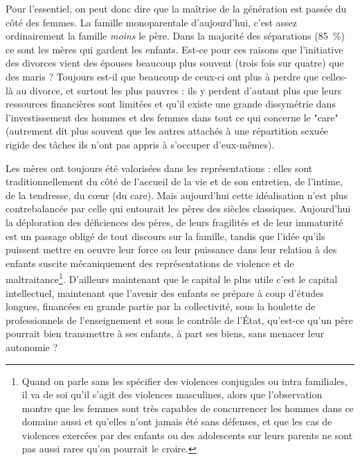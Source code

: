  Pour l'essentiel, on peut donc dire que la maîtrise de la génération est passée du côté des femmes. La famille monoparentale d'aujourd'hui, c'est assez ordinairement la famille \emph{moins} le père. Dans la majorité des séparations (85~\%) ce sont les mères qui gardent les enfants. Est-ce pour ces raisons que l'initiative des divorces vient des épouses beaucoup plus souvent (trois fois sur quatre) que des maris  ? Toujours est-il que beaucoup de ceux-ci ont plus à perdre que celles-là au divorce, et surtout les plus pauvres : ils y perdent d'autant plus que leurs ressources financières sont limitées et qu'il existe une grande dissymétrie dans l'investissement des hommes et des femmes dans tout ce qui concerne le "care" (autrement dit plus souvent que les autres attachés à une répartition sexuée rigide des tâches ils n'ont pas appris à s'occuper d'eux-mêmes). 

 Les mères ont toujours été valorisées dans les représentations : elles sont traditionnellement du côté de l'accueil de la vie et de son entretien, de l'intime, de la tendresse, du cœur (du care). Mais aujourd'hui cette idéalisation n'est plus contrebalancée par celle qui entourait les pères des siècles classiques. Aujourd'hui la déploration des déficiences des pères, de leurs fragilités et de leur immaturité est un passage obligé de tout discours sur la famille, tandis que l'idée qu'ils puissent mettre en oeuvre leur force ou leur puissance dans leur relation à des enfants suscite mécaniquement des représentations de violence et de maltraitance\footnote{Quand on parle sans les spécifier des violences conjugales ou intra familiales, il va de soi qu'il s'agit des violences masculines, alors que l'observation montre que les femmes sont très capables de concurrencer les hommes dans ce domaine aussi et qu'elles n'ont jamais été sans défenses, et que les cas de violences exercées par des enfants ou des adolescents sur leurs parents ne sont pas aussi rares qu'on pourrait le croire.}. D'ailleurs maintenant que le capital le plus utile c'est le capital intellectuel, maintenant que l'avenir des enfants se prépare à coup d'études longues, financées en grande partie par la collectivité, sous la houlette de professionnels de l'enseignement et sous le contrôle de l'État, qu'est-ce qu'un père pourrait bien transmettre à ses enfants, à part ses biens, sans menacer leur autonomie ?

